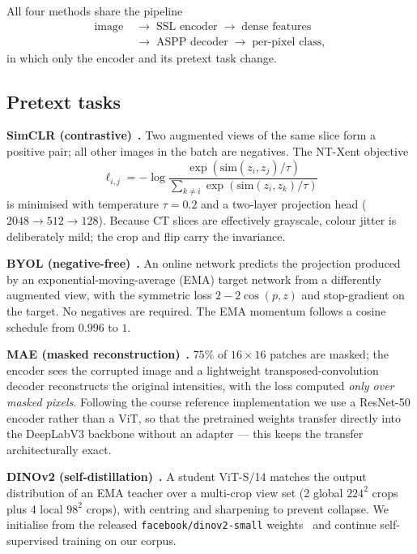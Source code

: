 \documentclass[conference]{IEEEtran}
\begin{document}
All four methods share the pipeline
\begin{equation*}
\begin{aligned}
\text{image}\;&\rightarrow\;\text{SSL encoder}\;\rightarrow\;\text{dense features}\\
             &\rightarrow\;\text{ASPP decoder}\;\rightarrow\;\text{per-pixel class},
\end{aligned}
\end{equation*}
in which only the encoder and its pretext task change.

\subsection{Pretext tasks}

\textbf{SimCLR (contrastive)}~\cite{simclr}\textbf{.} Two augmented views of the
same slice form a positive pair; all other images in the batch are negatives. The
NT-Xent objective
\[
\ell_{i,j}=-\log\frac{\exp(\mathrm{sim}(z_i,z_j)/\tau)}
                     {\sum_{k\neq i}\exp(\mathrm{sim}(z_i,z_k)/\tau)}
\]
is minimised with temperature $\tau=0.2$ and a two-layer projection head
($2048\!\to\!512\!\to\!128$). Because CT slices are effectively grayscale, colour
jitter is deliberately mild; the crop and flip carry the invariance.

\textbf{BYOL (negative-free)}~\cite{byol}\textbf{.} An online network predicts the
projection produced by an exponential-moving-average (EMA) target network from a
differently augmented view, with the symmetric loss $2-2\cos(p,z)$ and
stop-gradient on the target. No negatives are required. The EMA momentum follows a
cosine schedule from $0.996$ to $1$.

\textbf{MAE (masked reconstruction)}~\cite{mae}\textbf{.} $75\%$ of $16\times16$
patches are masked; the encoder sees the corrupted image and a lightweight
transposed-convolution decoder reconstructs the original intensities, with the
loss computed \emph{only over masked pixels}. Following the course reference
implementation we use a ResNet-50 encoder rather than a ViT, so that the
pretrained weights transfer directly into the DeepLabV3 backbone without an
adapter --- this keeps the transfer architecturally exact.

\textbf{DINOv2 (self-distillation)}~\cite{dinov2,dino}\textbf{.} A student
ViT-S/14 matches the output distribution of an EMA teacher over a multi-crop view
set (2 global $224^2$ crops plus 4 local $98^2$ crops), with centring and
sharpening to prevent collapse. We initialise from the released
\texttt{facebook/dinov2-small} weights~\cite{hf} and continue self-supervised
training on our corpus.
\end{document}
